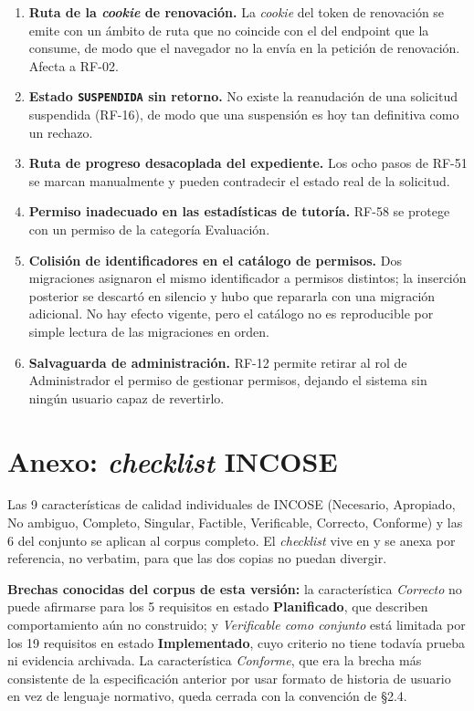 \documentclass[11pt,a4paper]{article}
\DeclareRobustCommand{\cd}[1]{\texttt{\protect\seqsplit{#1}}}
\newcommand{\estadoI}{\textcolor{ambar}{\textbf{Implementado}}}
\newcommand{\estadoP}{\textcolor{grisln}{\textbf{Planificado}}}
\begin{document}
\begin{enumerate}
    \item \textbf{Ruta de la \emph{cookie} de renovación.} La \emph{cookie} del token de
          renovación se emite con un ámbito de ruta que no coincide con el del endpoint que la
          consume, de modo que el navegador no la envía en la petición de renovación. Afecta a
          RF-02.
    \item \textbf{Estado \texttt{SUSPENDIDA} sin retorno.} No existe la reanudación de una
          solicitud suspendida (RF-16), de modo que una suspensión es hoy tan definitiva como un
          rechazo.
    \item \textbf{Ruta de progreso desacoplada del expediente.} Los ocho pasos de RF-51 se marcan
          manualmente y pueden contradecir el estado real de la solicitud.
    \item \textbf{Permiso inadecuado en las estadísticas de tutoría.} RF-58 se protege con un
          permiso de la categoría Evaluación.
    \item \textbf{Colisión de identificadores en el catálogo de permisos.} Dos migraciones
          asignaron el mismo identificador a permisos distintos; la inserción posterior se
          descartó en silencio y hubo que repararla con una migración adicional. No hay efecto
          vigente, pero el catálogo no es reproducible por simple lectura de las migraciones en
          orden.
    \item \textbf{Salvaguarda de administración.} RF-12 permite retirar al rol de Administrador
          el permiso de gestionar permisos, dejando el sistema sin ningún usuario capaz de
          revertirlo.
\end{enumerate}

\section{Anexo: \emph{checklist} INCOSE}

Las 9 características de calidad individuales de INCOSE (Necesario, Apropiado, No ambiguo,
Completo, Singular, Factible, Verificable, Correcto, Conforme) y las 6 del conjunto se aplican al
corpus completo. El \emph{checklist} vive en \cd{docs/checklists/INCOSE-REQUIREMENTS.md} y se
anexa por referencia, no verbatim, para que las dos copias no puedan divergir.

\textbf{Brechas conocidas del corpus de esta versión:} la característica \emph{Correcto} no puede
afirmarse para los 5 requisitos en estado \estadoP{}, que describen comportamiento aún no
construido; y \emph{Verificable como conjunto} está limitada por los 19 requisitos en estado
\estadoI{}, cuyo criterio no tiene todavía prueba ni evidencia archivada. La característica
\emph{Conforme}, que era la brecha más consistente de la especificación anterior por usar formato de
historia de usuario en vez de lenguaje normativo, queda cerrada con la convención de \S2.4.
\end{document}
